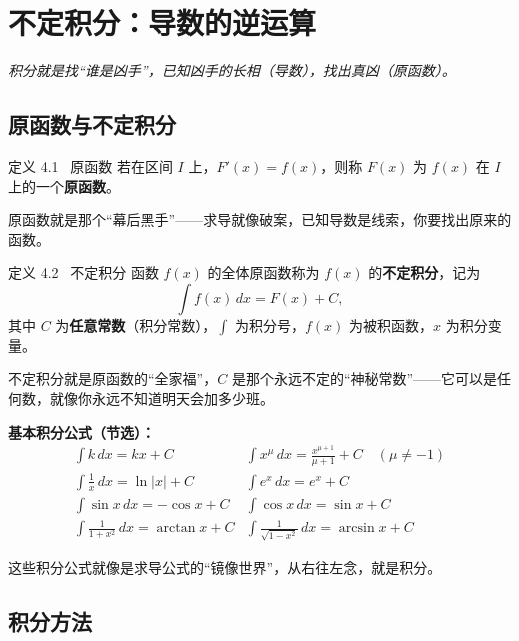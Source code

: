 \documentclass[12pt,a4paper]{article}
\newcommand{\redtext}[1]{{\color{MainRed}\textbf{#1}}}
\newcommand{\humor}[1]{\par\smallskip\begin{humorbox}#1\end{humorbox}\smallskip}
\begin{document}
\section{不定积分：导数的逆运算}
\begin{center}\textcolor{Sunshine}{\itshape 积分就是找“谁是凶手”，已知凶手的长相（导数），找出真凶（原函数）。}\end{center}

\subsection{原函数与不定积分}

\begin{defbox}{定义 4.1 \ 原函数}
若在区间 $I$ 上，$F'(x) = f(x)$，则称 $F(x)$ 为 $f(x)$ 在 $I$ 上的一个\textbf{原函数}。
\end{defbox}
\humor{原函数就是那个“幕后黑手”——求导就像破案，已知导数是线索，你要找出原来的函数。}

\begin{defbox}{定义 4.2 \ 不定积分}
函数 $f(x)$ 的全体原函数称为 $f(x)$ 的\textbf{不定积分}，记为
\[
\int f(x)\,dx = F(x) + C,
\]
其中 $C$ 为\redtext{任意常数}（积分常数），$\int$ 为积分号，$f(x)$ 为被积函数，$x$ 为积分变量。
\end{defbox}
\humor{不定积分就是原函数的“全家福”，$C$ 是那个永远不定的“神秘常数”——它可以是任何数，就像你永远不知道明天会加多少班。}

\begin{formulaframe}
\centering
\textbf{基本积分公式（节选）：}
\[
\begin{array}{ll}
\displaystyle\int k\,dx = kx + C & \displaystyle\int x^\mu\,dx = \frac{x^{\mu+1}}{\mu+1} + C \quad (\mu \neq -1) \\[10pt]
\displaystyle\int \frac{1}{x}\,dx = \ln|x| + C & \displaystyle\int e^x\,dx = e^x + C \\[10pt]
\displaystyle\int \sin x\,dx = -\cos x + C & \displaystyle\int \cos x\,dx = \sin x + C \\[10pt]
\displaystyle\int \frac{1}{1+x^2}\,dx = \arctan x + C & \displaystyle\int \frac{1}{\sqrt{1-x^2}}\,dx = \arcsin x + C
\end{array}
\]
\end{formulaframe}
\humor{这些积分公式就像是求导公式的“镜像世界”，从右往左念，就是积分。}

\subsection{积分方法}
\end{document}
